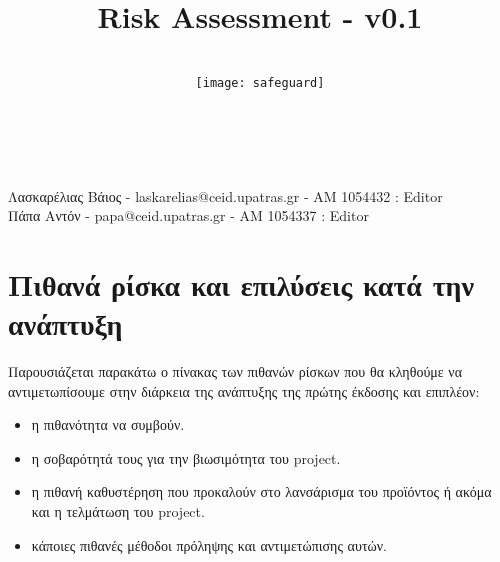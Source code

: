 \documentclass{article}
\title{Risk Assessment - v0.1}
\author{\\
\texttt{[image: safeguard]}\\[1ex]\\\\
}
\begin{document}
\maketitle
\newpage

\begin{center}
Λασκαρέλιας Βάιος - laskarelias@ceid.upatras.gr - ΑΜ 1054432 : Editor \\
Πάπα Αντόν - papa@ceid.upatras.gr - ΑΜ 1054337 : Editor
\end{center}
\renewcommand{\contentsname}{Περιεχόμενα}

\tableofcontents
\newpage

\thispagestyle{plain} %
\mbox{}
\newpage

\section{Πιθανά ρίσκα και επιλύσεις κατά την ανάπτυξη}
Παρουσιάζεται παρακάτω ο πίνακας των πιθανών ρίσκων που θα κληθούμε να αντιμετωπίσουμε στην διάρκεια της ανάπτυξης της πρώτης έκδοσης και επιπλέον:
\begin{itemize}
\item η πιθανότητα να συμβούν.
\item η σοβαρότητά τους για την βιωσιμότητα του project.
\item η πιθανή καθυστέρηση που προκαλούν στο λανσάρισμα του προϊόντος ή ακόμα και η τελμάτωση του project. 
\item κάποιες πιθανές μέθοδοι πρόληψης και αντιμετώπισης αυτών.
\end{itemize}
\end{document}

